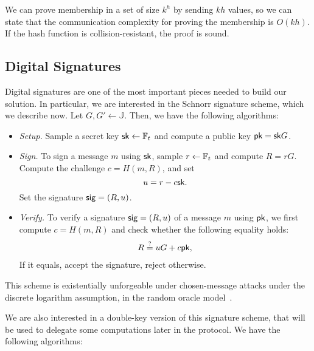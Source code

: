 We can prove membership in a set of size $k^h$ by sending $kh$ values, so we can state that the communication complexity for proving the membership is $O(kh)$. If the hash function is collision-resistant, the proof is sound.

\subsection{Digital Signatures}
\label{sec:signatures}

Digital signatures are one of the most important pieces needed to build our solution. In particular, we are interested in the Schnorr signature scheme, which we describe now. Let $G, G'\gets \mathbb{J}$. Then, we have the following algorithms:

\begin{itemize}
    \item \emph{Setup.} Sample a secret key $\mathsf{sk} \gets \mathbb{F}_t$ and compute a public key $\mathsf{pk} = \mathsf{sk} G$. 
    \item \emph{Sign.} To sign a message $m$ using $\mathsf{sk}$, sample $r \gets \mathbb{F}_t$ and compute $R = rG$. Compute the challenge $c = H(m, R)$, and set 
    \[u = r - c \mathsf{sk}.\]
    Set the signature $\mathsf{sig} = (R, u)$. 
    \item \emph{Verify.} To verify a signature $\mathsf{sig} = (R, u)$ of a message $m$ using $\mathsf{pk}$, we first compute $c = H(m, R)$ and check whether the following equality holds:
    \[\begin{aligned}
        & R \stackrel{?}{=} uG + c \mathsf{pk}, \\
    \end{aligned}\]
    If it equals, accept the signature, reject otherwise.
\end{itemize}

This scheme is existentially unforgeable under chosen-message attacks under the discrete logarithm assumption, in the random oracle model~\cite[Section 12.5.1]{katz2020introduction}.

We are also interested in a double-key version of this signature scheme, that will be used to delegate some computations later in the protocol. We have the following algorithms:

